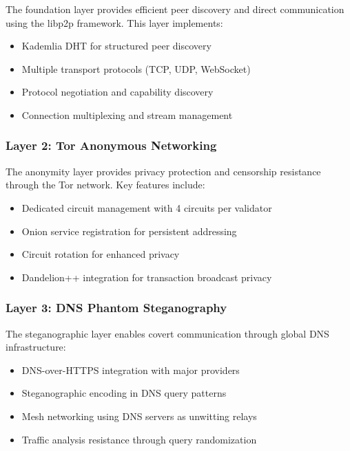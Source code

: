 \documentclass[11pt,a4paper]{article}
\theoremstyle{definition}
\theoremstyle{remark}
\begin{document}
The foundation layer provides efficient peer discovery and direct communication using the libp2p framework. This layer implements:

\begin{itemize}
    \item Kademlia DHT for structured peer discovery
    \item Multiple transport protocols (TCP, UDP, WebSocket)
    \item Protocol negotiation and capability discovery
    \item Connection multiplexing and stream management
\end{itemize}

\subsubsection{Layer 2: Tor Anonymous Networking}

The anonymity layer provides privacy protection and censorship resistance through the Tor network. Key features include:

\begin{itemize}
    \item Dedicated circuit management with 4 circuits per validator
    \item Onion service registration for persistent addressing
    \item Circuit rotation for enhanced privacy
    \item Dandelion++ integration for transaction broadcast privacy
\end{itemize}

\subsubsection{Layer 3: DNS Phantom Steganography}

The steganographic layer enables covert communication through global DNS infrastructure:

\begin{itemize}
    \item DNS-over-HTTPS integration with major providers
    \item Steganographic encoding in DNS query patterns
    \item Mesh networking using DNS servers as unwitting relays
    \item Traffic analysis resistance through query randomization
\end{itemize}
\end{document}
